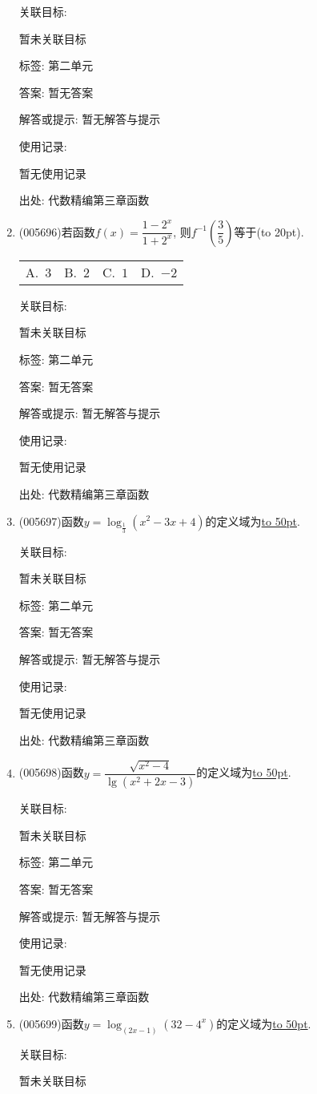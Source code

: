 \documentclass[10pt,a4paper]{article}
\newcommand{\blank}[1]{\underline{\hbox to #1pt{}}}
\newcommand{\bracket}[1]{(\hbox to #1pt{})}
\newcommand{\fourch}[4]{\par\begin{tabular}{p{.23\textwidth}p{.23\textwidth}p{.23\textwidth}p{.23\textwidth}}
A.~#1 &B.~#2& C.~#3& D.~#4
\end{tabular}}
\begin{document}
\begin{enumerate}[1.]
关联目标:

暂未关联目标



标签: 第二单元

答案: 暂无答案

解答或提示: 暂无解答与提示

使用记录:

暂无使用记录


出处: 代数精编第三章函数
\item { (005696)}若函数$f(x)=\dfrac{1-2^x}{1+2^x}$, 则$f^{-1}(\dfrac 35)$等于\bracket{20}.
\fourch{$3$}{$2$}{$1$}{$-2$}


关联目标:

暂未关联目标



标签: 第二单元

答案: 暂无答案

解答或提示: 暂无解答与提示

使用记录:

暂无使用记录


出处: 代数精编第三章函数
\item { (005697)}函数$y=\log_{\frac 13}(x^2-3x+4)$的定义域为\blank{50}.


关联目标:

暂未关联目标



标签: 第二单元

答案: 暂无答案

解答或提示: 暂无解答与提示

使用记录:

暂无使用记录


出处: 代数精编第三章函数
\item { (005698)}函数$y=\dfrac{\sqrt {x^2-4}}{\lg (x^2+2x-3)}$的定义域为\blank{50}.


关联目标:

暂未关联目标



标签: 第二单元

答案: 暂无答案

解答或提示: 暂无解答与提示

使用记录:

暂无使用记录


出处: 代数精编第三章函数
\item { (005699)}函数$y=\log_{(2x-1)}(32-4^x)$的定义域为\blank{50}.


关联目标:

暂未关联目标




\end{enumerate}
\end{document}
